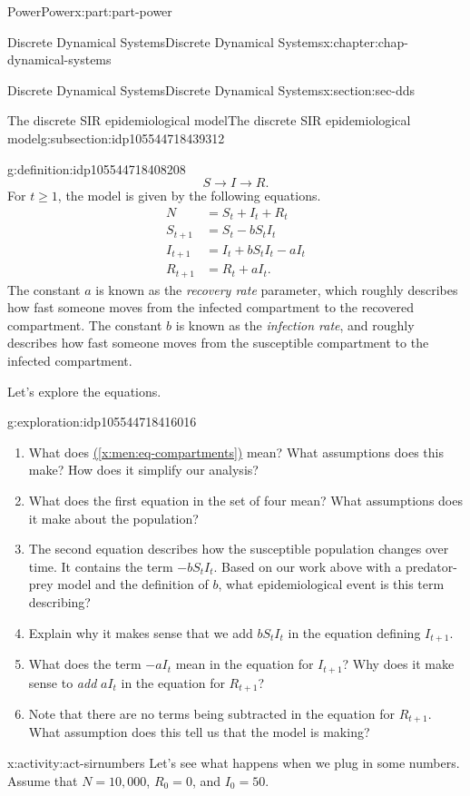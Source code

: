 \documentclass[oneside,10pt,]{book}
\newcommand{\xreffont}{\relax}
\numberwithin{equation}{section}
\renewcommand{\ge}{\geqslant}
\newcommand{\amp}{&}
\begin{document}
\begin{partptx}{Power}{}{Power}{}{}{x:part:part-power}
\begin{chapterptx}{Discrete Dynamical Systems}{}{Discrete Dynamical Systems}{}{}{x:chapter:chap-dynamical-systems}
\begin{sectionptx}{Discrete Dynamical Systems}{}{Discrete Dynamical Systems}{}{}{x:section:sec-dds}
\begin{subsectionptx}{The discrete SIR epidemiological model}{}{The discrete SIR epidemiological model}{}{}{g:subsection:idp105544718439312}
\begin{definition}{}{g:definition:idp105544718408208}
\begin{equation}
S \to I \to R.\label{x:men:eq-compartments}
\end{equation}
For \(t\ge 1\), the model is given by the following equations.%
%
\begin{align*}
N \amp = S_t + I_t + R_t\\
S_{t+1} \amp = S_t -b S_t I_t\\
I_{t+1} \amp = I_t + b S_t I_t - a I_t\\
R_{t+1} \amp = R_t + a I_t.
\end{align*}
The constant \(a\) is known as the \emph{recovery rate} parameter, which roughly describes how fast someone moves from the infected compartment to the recovered compartment. The constant \(b\) is known as the \emph{infection rate}, and roughly describes how fast someone moves from the susceptible compartment to the infected compartment.%
\end{definition}
Let's explore the equations.%
\begin{exploration}{}{g:exploration:idp105544718416016}%
%
\begin{enumerate}
\item{}What does \hyperref[x:men:eq-compartments]{({\xreffont\ref{x:men:eq-compartments}})} mean? What assumptions does this make? How does it simplify our analysis?%
\item{}What does the first equation in the set of four mean? What assumptions does it make about the population?%
\item{}The second equation describes how the susceptible population changes over time. It contains the term \(-b S_t I_t\). Based on our work above with a predator-prey model and the definition of \(b\), what epidemiological event is this term describing?%
\item{}Explain why it makes sense that we add \(b S_t I_t\) in the equation defining \(I_{t+1}\).%
\item{}What does the term \(-a I_t\) mean in the equation for \(I_{t+1}\)? Why does it make sense to \emph{add} \(a I_t\) in the equation for \(R_{t+1}\)?%
\item{}Note that there are no terms being subtracted in the equation for \(R_{t+1}\). What assumption does this tell us that the model is making?%
\end{enumerate}
\end{exploration}%
\begin{activity}{}{x:activity:act-sirnumbers}%
Let's see what happens when we plug in some numbers. Assume that \(N = 10,000\), \(R_0 = 0\), and \(I_0 = 50\).%

\end{activity}
\end{subsectionptx}
\end{sectionptx}
\end{chapterptx}
\end{partptx}
\end{document}
